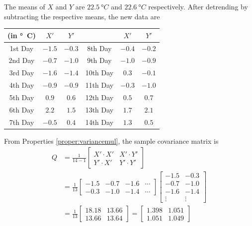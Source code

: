 \begin{solution}
The means of $X$ and $Y$ are $\SI{22.5}{\degree C}$ and $\SI{22.6}{\degree C}$ respectively. After detrending by subtracting the respective means, the new data are
\begin{center}
\begin{tabular}{|c|c|c|c|c|c|}
\hline
(in \si{\degree C}) & $X'$ & $Y'$ & & $X'$ & $Y'$ \\
\hline
1st Day & $-1.5$ & $-0.3$ & 8th Day & $-0.4$ & $-0.2$ \\
\hline
2nd Day & $-0.7$ & $-1.0$ & 9th Day & $-1.0$ & $-0.9$ \\
\hline
3rd Day & $-1.6$ & $-1.4$ & 10th Day & $0.3$ & $-0.1$ \\
\hline
4th Day & $-0.9$ & $-0.9$ & 11th Day & $-0.3$ & $-1.0$ \\
\hline
5th Day & $0.9$ & $0.6$ & 12th Day & $0.5$ & $0.7$ \\
\hline 
6th Day & $2.2$ & $1.5$ & 13th Day & $1.7$ & $2.1$ \\
\hline 
7th Day & $-0.5$ & $0.4$ & 14th Day & $1.3$ & $0.5$ \\
\hline
\end{tabular}
\end{center}
From Properties \ref{proper:variancemul}, the sample covariance matrix is
\begin{align*}
Q &= 
\frac{1}{14-1}
\begin{bmatrix}
X' \cdot X' & X' \cdot Y' \\
Y' \cdot X' & Y' \cdot Y' 
\end{bmatrix} \\
&= \frac{1}{13}
\begin{bmatrix}
-1.5 & -0.7 & -1.6 & \cdots \\
-0.3 & -1.0 & -1.4 & \cdots
\end{bmatrix}
\begin{bmatrix}
-1.5 & -0.3 \\
-0.7 & -1.0 \\
-1.6 & -1.4 \\
\vdots & \vdots
\end{bmatrix} \\
&= \frac{1}{13}
\begin{bmatrix}
18.18 & 13.66 \\
13.66 & 13.64
\end{bmatrix} = 
\begin{bmatrix}
1.398 & 1.051 \\
1.051 & 1.049
\end{bmatrix}

\end{align*}
\end{solution}
